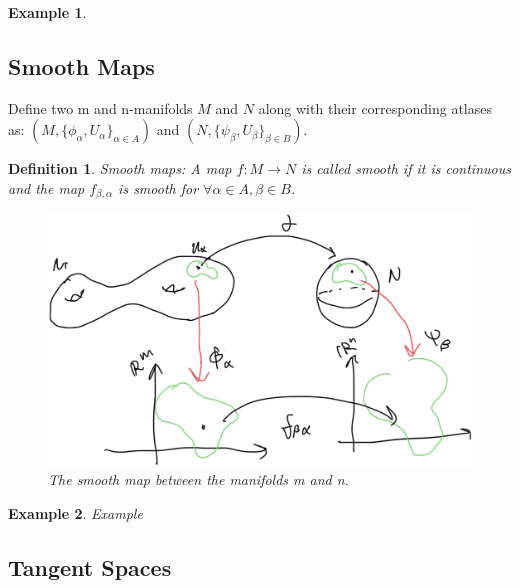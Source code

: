 \documentclass{article}
\newtheorem{definition}{Definition}
\newtheorem{example}{Example}
\begin{document}
\begin{example}
    
\end{example}

\subsection{Smooth Maps}

Define two m and n-manifolds $M$ and $N$ along with their corresponding atlases as: $(M, \{ \phi_{\alpha}, U_{\alpha} \}_{\alpha \in A})$ and $(N, \{ \psi_{\beta}, U_{\beta} \} _{\beta \in B})$. 

\begin{definition}
        Smooth maps:
        A map $f: M \rightarrow N$ is called smooth if it is continuous and the map $f_{\beta, \alpha}$ is smooth for $\forall \alpha \in A, \beta \in B$. 
        \begin{figure}[hbt!]
            \centering
            \includegraphics[width=0.5\linewidth]{figures/smooth_map.PNG}
            \caption{The smooth map between the manifolds m and n.}
            \label{fig:smooth_maps}
        \end{figure}
\end{definition}

\begin{example}
        Example
\end{example}

\subsection{Tangent Spaces}
\end{document}
